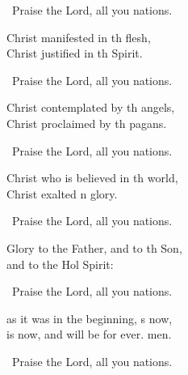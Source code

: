 \begin{psalmverse}%
\begin{patverse}
  
\resp\ Praise the Lord, all you nations.

Christ manifested in th flesh,\Med\\
Christ justified in th Spirit.

\resp\ Praise the Lord, all you nations.

Christ contemplated by th angels,\Med\\
Christ proclaimed by th pagans.

\resp\ Praise the Lord, all you nations.

Christ who is believed in th world,\Med\\
Christ exalted \pointup{\i}n glory.

\resp\ Praise the Lord, all you nations.

Glory to the Father, and to th Son,\Med\\
and to the Hol Spirit:

\resp\ Praise the Lord, all you nations.

as it was in the beginning, \pointup{\i}s now,\Med\\
is now, and will be for ever. men.

\resp\ Praise the Lord, all you nations.
\end{patverse}
\end{psalmverse}
